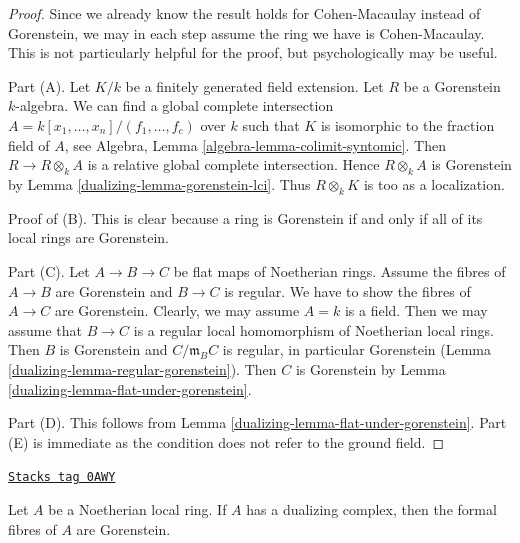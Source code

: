 \begin{proof}

Since we already know the result holds for Cohen-Macaulay instead
of Gorenstein, we may in each step assume the ring we have is
Cohen-Macaulay. This is not particularly helpful for the proof, but
psychologically may be useful.

\medskip\noindent
Part (A). Let $K/k$ be a finitely generated field extension.
Let $R$ be a Gorenstein $k$-algebra.
We can find a global complete intersection
$A = k[x_1, \ldots, x_n]/(f_1, \ldots, f_c)$
over $k$ such that $K$ is isomorphic to the fraction field of $A$, see
Algebra, Lemma \ref{algebra-lemma-colimit-syntomic}.
Then $R \to R \otimes_k A$ is a relative global complete intersection.
Hence $R \otimes_k A$ is Gorenstein by Lemma \ref{dualizing-lemma-gorenstein-lci}.
Thus $R \otimes_k K$ is too as a localization.

\medskip\noindent
Proof of (B). This is clear because a ring is Gorenstein
if and only if all of its local rings are Gorenstein.

\medskip\noindent
Part (C). Let $A \to B \to C$ be flat maps of Noetherian rings.
Assume the fibres of $A \to B$ are Gorenstein and $B \to C$ is regular.
We have to show the fibres of $A \to C$ are Gorenstein.
Clearly, we may assume $A = k$ is a field. Then we may assume that
$B \to C$ is a regular local homomorphism of Noetherian local rings.
Then $B$ is Gorenstein and $C/\mathfrak m_B C$ is regular, in
particular Gorenstein (Lemma \ref{dualizing-lemma-regular-gorenstein}).
Then $C$ is Gorenstein by
Lemma \ref{dualizing-lemma-flat-under-gorenstein}.

\medskip\noindent
Part (D). This follows from Lemma \ref{dualizing-lemma-flat-under-gorenstein}.
Part (E) is immediate as the condition does not refer to the ground field.
\end{proof}

\begin{lemma}
\label{dualizing-lemma-dualizing-gorenstein-formal-fibres}
\href{https://stacks.math.columbia.edu/tag/0AWY}{\texttt{Stacks tag 0AWY}}

Let $A$ be a Noetherian local ring. If $A$ has a dualizing complex,
then the formal fibres of $A$ are Gorenstein.
\end{lemma}

